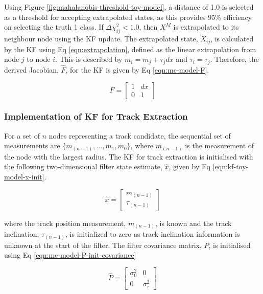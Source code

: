 Using Figure \ref{fig:mahalanobis-threshold-toy-model}, a distance of 1.0 is selected as a threshold for accepting extrapolated states, as this provides 95\% efficiency on selecting the truth 1 class. If $\Delta \chi_{ij}^{2} < 1.0$, then $X^M$ is extrapolated to its neighbour node using the KF update. The extrapolated state, $\widetilde{X}_{ij}$, is calculated by the KF using Eq \eqref{eqn:extrapolation}, defined as the linear extrapolation from node $j$ to node $i$. This is described by $m_i = m_j + \tau_j dx$ and $\tau_i = \tau_j$. Therefore, the derived Jacobian, $\hat{F}$, for the KF is given by Eq \eqref{eqn:mc-model-F}.


\begin{equation}
\hat{F} = \begin{bmatrix} 1 & dx \\ 0 & 1 \end{bmatrix}
\label{eqn:mc-model-F}
\end{equation}



\subsubsection{Implementation of KF for Track Extraction}

For a set of $n$ nodes representing a track candidate, the sequential set of measurements are $\{m_{(n-1)}, ..., m_1, m_0 \}$, where $m_{(n-1)}$ is the measurement of the node with the largest radius. The KF for track extraction is initialised with the following two-dimensional filter state estimate, $\hat{x}$, given by Eq \eqref{eqn:kf-toy-model-x-init}.

\begin{equation}
\hat{x} = \begin{bmatrix} m_{(n-1)} \\ \tau_{(n-1)} \end{bmatrix}
\label{eqn:kf-toy-model-x-init}
\end{equation}

where the track position measurement, $m_{(n-1)}$, is known and the track inclination, $\tau_{(n-1)}$, is initialized to zero as track inclination information is unknown at the start of the filter. The filter covariance matrix, $\hat{P}$, is initialised using Eq \eqref{eqn:mc-model-P-init-covariance}

\begin{equation}
\hat{P} = \begin{bmatrix} \sigma_0^{2} & 0 \\ 0 & \sigma_{\tau}^2 \end{bmatrix}
\label{eqn:mc-model-P-init-covariance}
\end{equation}

